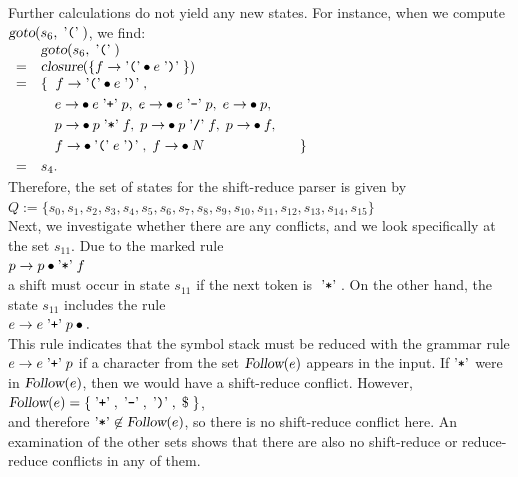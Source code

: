 Further calculations do not yield any new states. For instance, when we compute \(\textsl{goto}(s_6,\;\mbox{'\texttt{(}'}\;)\), we find:
\\[0.2cm]
\hspace*{1.3cm}
$ 
\begin{array}{cl}
    & \textsl{goto}(s_6, \aquoted{(}) \\
  = & \textsl{closure}(\{ f \rightarrow \saquoted{(} \mdot e \aquoted{)} \}) \\
  = & \{\;\; f \rightarrow \saquoted{(} \mdot e \aquoted{)}, \\[0.1cm]
    & \quad e \rightarrow \mdot e \aquoted{+} p,\; 
            e \rightarrow \mdot e \aquoted{-} p,\;
            e \rightarrow \mdot p,                  \\[0.1cm]
    & \quad p \rightarrow \mdot p \aquoted{*} f,\;
            p \rightarrow \mdot p \aquoted{/} f,\;
            p \rightarrow \mdot f,                \\[0.1cm]
    & \quad f \rightarrow \mdot \saquoted{(}\; e \aquoted{)},\;
            f \rightarrow \mdot N   \hspace*{2.4cm} \} \\[0.1cm]
  = & s_4.
\end{array}
$
\\[0.2cm]
Therefore, the set of states for the shift-reduce parser is given by
\\[0.2cm]
\hspace*{1.3cm}
\( Q := \{ s_0, s_1, s_2, s_3, s_4, s_5, s_6, s_7, s_8, s_9, s_{10}, s_{11}, s_{12}, s_{13}, s_{14}, s_{15} \} \)
\\[0.2cm]
Next, we investigate whether there are any conflicts, and we look specifically at the set \(s_{11}\). Due to
the marked rule
\\[0.2cm]
\hspace*{1.3cm}
\( p \rightarrow p \mdot \saquoted{*}\; f \)
\\[0.2cm]
a shift must occur in state \(s_{11}\) if the next token is \(\;\mbox{'\texttt{*}'}\;\). On the other hand, the state
\(s_{11}\) includes the rule
\\[0.2cm]
\hspace*{1.3cm}
\( e \rightarrow e \aquoted{+} p \mdot. \)
\\[0.2cm]
This rule indicates that the symbol stack must be reduced with the grammar rule \(e \rightarrow e \;\mbox{'\texttt{+}'}\;
p\) if a character from the set \(\textsl{Follow}(e)\) appears in the input. If \(\mbox{'\texttt{*}'}\) were in
\(\textsl{Follow}(e)\), then we would have a shift-reduce conflict. However, 
\\[0.2cm]
\hspace*{1.3cm}
\( \textsl{Follow}(e) = \{ \aquoted{+}, \aquoted{-}, \aquoted{)}, \;\symbol{36}\; \} \),
\\[0.2cm]
and therefore \(\mbox{'\texttt{*}'} \not\in \textsl{Follow}(e)\), so there is no shift-reduce conflict here. An
examination of the other sets shows that there are also no shift-reduce or reduce-reduce conflicts in any of them.

